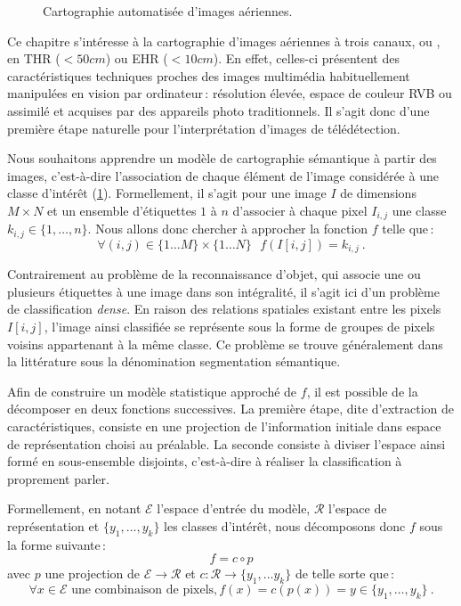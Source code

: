 \begin{figure}[ht]
	\resizebox{\textwidth}{!}{}
	\caption{Cartographie automatisée d'images aériennes.}
	\label{fig:semantic_mapping}
\end{figure}

Ce chapitre s'intéresse à la cartographie d'images aériennes à trois canaux,  ou , en \gls{THR} ($<50cm$) ou \gls{EHR} ($<10cm$). En effet, celles-ci présentent des caractéristiques techniques proches des images multimédia habituellement manipulées en vision par ordinateur\,: résolution élevée, espace de couleur \gls{RVB} ou assimilé et acquises par des appareils photo traditionnels. Il s'agit donc d'une première étape naturelle pour l'interprétation d'images de télédétection.

Nous souhaitons apprendre un modèle de cartographie sémantique à partir des images, c'est-à-dire l'association de chaque élément de l'image considérée à une classe d'intérêt (\cref{fig:semantic_mapping}). Formellement, il s'agit pour une image $I$ de dimensions $M \times N$ et un ensemble d'étiquettes $1$ à $n$ d'associer à chaque pixel $I_{i,j}$ une classe $k_{i,j} \in \{1,\dots,n\}$. Nous allons donc chercher à approcher la fonction $f$ telle que\,:
\begin{equation}
	\forall (i,j) \in \{1\dots{}M\}\times\{1\dots{}N\}~~~f(I[i,j]) = k_{i,j}~.
\end{equation}

Contrairement au problème de la reconnaissance d'objet, qui associe une ou plusieurs étiquettes à une image dans son intégralité, il s'agit ici d'un problème de classification \emph{dense}. En raison des relations spatiales existant entre les pixels $I[i,j]$, l'image ainsi classifiée se représente sous la forme de groupes de pixels voisins appartenant à la même classe. Ce problème se trouve généralement dans la littérature sous la dénomination \og segmentation sémantique\fg.

Afin de construire un modèle statistique approché de $f$, il est possible de la décomposer en deux fonctions successives. La première étape, dite d'extraction de caractéristiques, consiste en une projection de l'information initiale dans espace de représentation choisi au préalable. La seconde consiste à diviser l'espace ainsi formé en sous-ensemble disjoints, c'est-à-dire à réaliser la classification à proprement parler.

Formellement, en notant $\mathcal{E}$ l'espace d'entrée du modèle, $\mathcal{R}$ l'espace de représentation et $\{y_1, \dots, y_k\}$ les classes d'intérêt, nous décomposons donc $f$ sous la forme suivante\,:
\begin{equation}
	f = c \circ p
\end{equation}
avec $p$ une projection de $\mathcal{E} \rightarrow \mathcal{R}$ et $c : \mathcal{R} \rightarrow \{y_1, \dots y_k\}$ de telle sorte que\,:
\begin{equation}
	\forall x \in \mathcal{E} \text{~une combinaison de pixels}, f(x) = c(p(x)) = y \in \{y_1, \dots, y_k\}~.
\end{equation}

